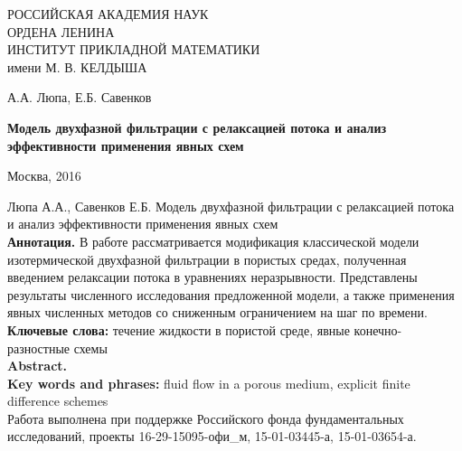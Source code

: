 \begin{titlepage}
\begin{center}

{РОССИЙСКАЯ АКАДЕМИЯ НАУК \\
ОРДЕНА ЛЕНИНА \\
ИНСТИТУТ ПРИКЛАДНОЙ МАТЕМАТИКИ \\
имени М. В. КЕЛДЫША \\
\par}

\vspace{80mm}

{А.А. Люпа, Е.Б. Савенков\par}

\vspace{10mm}

{\bf \large Модель двухфазной фильтрации с релаксацией потока
и анализ эффективности применения явных схем
\par}

\end{center}

\vspace{\fill}

\begin{center}
{Москва, 2016}
\end{center}

\clearpage
\end{titlepage}
\newpage


Люпа А.А., Савенков Е.Б. Модель двухфазной фильтрации с релаксацией потока
и анализ эффективности применения явных схем
\\

{\bf Аннотация.} В работе рассматривается модификация классической модели
изотермической двухфазной фильтрации в пористых средах, полученная 
введением релаксации потока в уравнениях неразрывности.
Представлены результаты численного исследования предложенной модели,
а также применения явных численных методов со сниженным ограничением на
шаг по времени.
\\

{\bf Ключевые слова:} течение жидкости в пористой среде, явные конечно-разностные схемы
\\

{\bf Abstract.}
\\

{\bf Key words and phrases:} fluid flow in a porous medium, explicit finite difference schemes
\\

Работа выполнена при поддержке Российского фонда фундаментальных исследований, проекты 16-29-15095-офи\_м, 15-01-03445-а, 15-01-03654-а.
